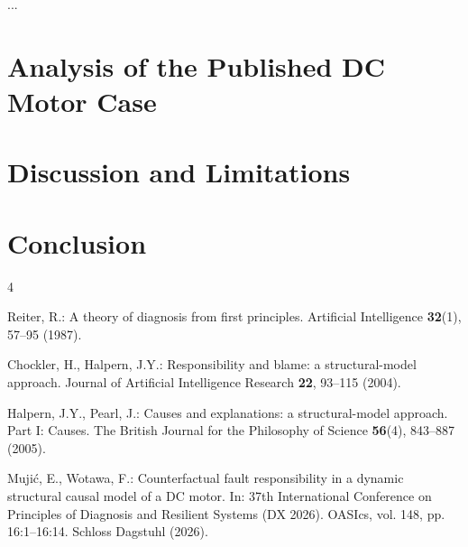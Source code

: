\documentclass[runningheads]{llncs}
\begin{document}
...

\section{Analysis of the Published DC Motor Case}

\section{Discussion and Limitations}

\section{Conclusion}

\begin{thebibliography}{4}

Reiter, R.: A theory of diagnosis from first principles.
Artificial Intelligence \textbf{32}(1), 57--95 (1987).

Chockler, H., Halpern, J.Y.: Responsibility and blame:
a structural-model approach.
Journal of Artificial Intelligence Research \textbf{22}, 93--115 (2004).

Halpern, J.Y., Pearl, J.: Causes and explanations:
a structural-model approach. Part I: Causes.
The British Journal for the Philosophy of Science
\textbf{56}(4), 843--887 (2005).

Muji\'{c}, E., Wotawa, F.: Counterfactual fault responsibility
in a dynamic structural causal model of a DC motor.
In: 37th International Conference on Principles of Diagnosis
and Resilient Systems (DX 2026).
OASIcs, vol. 148, pp. 16:1--16:14.
Schloss Dagstuhl (2026).

\end{thebibliography}
\end{document}
